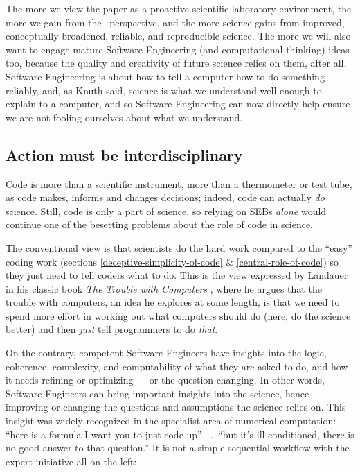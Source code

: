 \documentclass{comjnl}
\begin{document}
The more we view the paper as a proactive scientific laboratory environment, the more we gain from the \RAPstar\ perspective, and the more science gains from improved, conceptually broadened, reliable, and reproducible science. The more we will also want to engage mature Software Engineering (and computational thinking) ideas too, because the quality and creativity of future science relies on them, after all, Software Engineering is about how to tell a computer how to do something reliably, and, as Knuth said, science is what we understand well enough to explain to a computer, and so Software Engineering can now directly help ensure we are not fooling ourselves about what we understand.

\subsection{Action must be interdisciplinary}
Code is more than a scientific instrument, more than a thermometer or test tube, as code makes, informs and changes decisions; indeed, code can actually \emph{do\/} science. Still, code is only a part of science, so relying on SEBs \emph{alone\/} would continue one of the besetting problems about the role of code in science. 

The conventional view is that scientists do the hard work compared to the ``easy'' coding work (sections \ref{deceptive-simplicity-of-code} \& \ref{central-role-of-code}) so they just need to tell coders what to do. This is the view expressed by Landauer in his classic book \emph{The Trouble with Computers\/} \cite{landauer,thimbleby-landauer}, where he argues that the trouble with computers, an idea he explores at some length, is that we need to spend more effort in working out what computers should do (here, do the science better) and then \emph{just\/} tell programmers to do \emph{that}.  

On the contrary, competent Software Engineers have insights into the logic, coherence, complexity, and computability of what they are asked to do, and how it needs refining or optimizing --- or the question changing. In other words, Software Engineers can bring important insights into the science, hence improving or changing the questions and assumptions the science relies on. This insight was widely recognized in the specialist area of numerical computation: ``here is a formula I want you to just code up''~\ldots\ ``but it's ill-conditioned, there is no good answer to that question.'' It is not a simple sequential workflow with the expert initiative all on the left:
\end{document}
